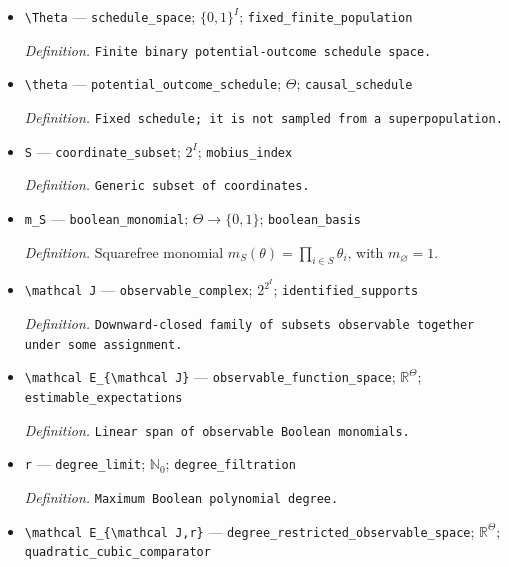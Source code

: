 \documentclass{article}
\begin{document}
\begin{itemize}
  \item \texttt{\textbackslash{}\allowbreak{}Theta} --- \texttt{schedule\_\allowbreak{}space}; \(\{0,1\}^I\); \texttt{fixed\_\allowbreak{}finite\_\allowbreak{}population}
  \par\smallskip\noindent\emph{Definition.} \texttt{Finite binary potential-\allowbreak{}outcome schedule space.}
  \item \texttt{\textbackslash{}\allowbreak{}theta} --- \texttt{potential\_\allowbreak{}outcome\_\allowbreak{}schedule}; \(\Theta\); \texttt{causal\_\allowbreak{}schedule}
  \par\smallskip\noindent\emph{Definition.} \texttt{Fixed schedule;\allowbreak{} it is not sampled from a superpopulation.}
  \item \texttt{S} --- \texttt{coordinate\_\allowbreak{}subset}; \(2^I\); \texttt{mobius\_\allowbreak{}index}
  \par\smallskip\noindent\emph{Definition.} \texttt{Generic subset of coordinates.}
  \item \texttt{m\_\allowbreak{}S} --- \texttt{boolean\_\allowbreak{}monomial}; \(\Theta\to\{0,1\}\); \texttt{boolean\_\allowbreak{}basis}
  \par\smallskip\noindent\emph{Definition.} Squarefree monomial \(m_S(\theta)=\prod_{i\in S}\theta_i\), with \(m_\varnothing=1\).
  \item \texttt{\textbackslash{}\allowbreak{}mathcal J} --- \texttt{observable\_\allowbreak{}complex}; \(2^{2^I}\); \texttt{identified\_\allowbreak{}supports}
  \par\smallskip\noindent\emph{Definition.} \texttt{Downward-\allowbreak{}closed family of subsets observable together under some assignment.}
  \item \texttt{\textbackslash{}\allowbreak{}mathcal E\_\allowbreak{}\{\textbackslash{}\allowbreak{}mathcal J\}\allowbreak{}} --- \texttt{observable\_\allowbreak{}function\_\allowbreak{}space}; \(\mathbb R^\Theta\); \texttt{estimable\_\allowbreak{}expectations}
  \par\smallskip\noindent\emph{Definition.} \texttt{Linear span of observable Boolean monomials.}
  \item \texttt{r} --- \texttt{degree\_\allowbreak{}limit}; \(\mathbb N_0\); \texttt{degree\_\allowbreak{}filtration}
  \par\smallskip\noindent\emph{Definition.} \texttt{Maximum Boolean polynomial degree.}
  \item \texttt{\textbackslash{}\allowbreak{}mathcal E\_\allowbreak{}\{\textbackslash{}\allowbreak{}mathcal J,\allowbreak{}r\}\allowbreak{}} --- \texttt{degree\_\allowbreak{}restricted\_\allowbreak{}observable\_\allowbreak{}space}; \(\mathbb R^\Theta\); \texttt{quadratic\_\allowbreak{}cubic\_\allowbreak{}comparator}

\end{itemize}
\end{document}

